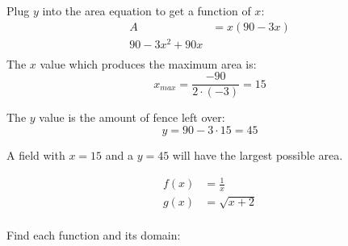 \documentclass[fleqn,addpoints]{exam}
\begin{document}
\begin{questions}
\begin{solution}[9 cm]
      Plug $y$ into the area equation to get a function of $x$:
      \begin{align*}
        A &= x(90 - 3x) \\
        90 - 3x^2 + 90x \\
      \end{align*}
      The $x$ value which produces the maximum area is:
      \[
        x_{max} = \frac{-90}{2 \cdot (-3)} = 15
      \]

      The $y$ value is the amount of fence left over:
      \[
        y = 90 - 3 \cdot 15 = 45
      \]

      A field with $x = 15$ and a $y = 45$ will have the largest possible area.

    \end{solution}

  \ifprintanswers
  \else
    \pagebreak
  \fi

  \question
    \begin{align*}
      f(x) &= \frac{1}{x} \\
      g(x) &= \sqrt{x + 2} \\
    \end{align*}

    Find each function and its domain:

    \begin{parts}
      \part[3] $(f + g)(x)$
        \begin{solution}[3 cm]
          $(f + g)(x) = \frac{1}{x} + \sqrt{x + 2}$;
          
          Domain: $[-2, 0) \cup (0, \infty)$
        \end{solution}
      
      \part[3] $(f / g)(x)$
        \begin{solution}[3 cm]
          $(f / g)(x) = \frac{1}{x \sqrt{x + 2}}$

          Domain: $(-2, 0) \cup (0, \infty)$
        \end{solution}

      \part[3] $(f \circ g)(x)$
        \begin{solution}[3 cm]
          $(f \circ g)(x) = \frac{1}{\sqrt{x + 2}}$


\end{solution}
\end{parts}
\end{questions}
\end{document}
